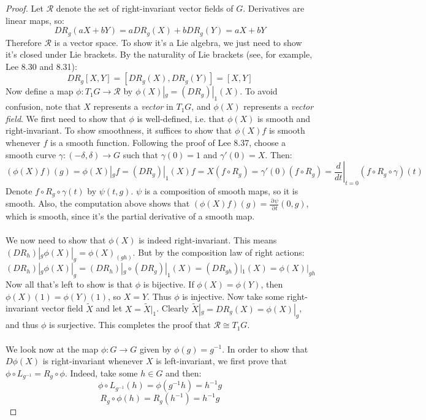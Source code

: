 \documentclass[12 pt]{article}
\DeclareMathOperator {\p} {\partial}
\begin{document}
\begin{proof}
Let $\mathcal{R}$ denote the set of right-invariant vector fields of $G$. Derivatives are linear maps, so: 
\[  DR_g (aX + bY) = a DR_g(X) + b DR_g(Y) = aX + bY \]
Therefore $\mathcal{R}$ is a vector space. To show it's a Lie algebra, we just need to show it's closed under Lie brackets. By the naturality of Lie brackets (see, for example, Lee 8.30 and 8.31):
\[    DR_g [X,Y] = [DR_g (X) , DR_g (Y)] = [X,Y]   \]
Now define a map $\phi : T_1G \to \mathcal{R}$ by $\phi(X)|_{g} = (DR_g)|_{1} (X)$. To avoid confusion, note that $X$ represents a \emph{vector} in $T_1G$, and $\phi(X)$ represents a \emph{vector field}. We first need to show that $\phi$ is well-defined, i.e. that $\phi(X)$ is smooth and right-invariant. To show smoothness, it suffices to show that $\phi(X) f$ is smooth whenever $f$ is a smooth function. Following the proof of Lee 8.37, choose a smooth curve $\gamma: (- \delta, \delta) \to G$ such that $\gamma(0) = 1$ and $\gamma'(0) = X$. Then:
\[      ( \phi(X) f) (g) = \phi(X)|_g f = (DR_g)|_1 (X) f = X(f\circ R_g) = \gamma'(0) (f\circ R_g) = \left.\frac{d}{dt}\right|_{t=0} (f\circ R_g \circ \gamma)(t)     \]
Denote $f\circ R_g \circ \gamma(t)$ by $\psi(t, g)$. $\psi$ is a composition of smooth maps, so it is smooth. Also, the computation above shows that $(\phi(X) f) (g) = \frac{\p \psi}{ \p t }(0,g)$, which is smooth, since it's the partial derivative of a smooth map.
\\
\\
We now need to show that $\phi(X)$ is indeed right-invariant. This means $(DR_h)|_g \phi(X)|_g = \phi(X)_(gh)$. But by the composition law of right actions:
\[           (DR_h)|_g \phi(X)|_g =    (DR_h)|_g\circ (DR_g)|_1 (X)  = (DR_{gh})|_1 (X) = \phi(X)|_{gh}   \]
Now all that's left to show is that $\phi$ is bijective. If $\phi(X) = \phi(Y)$, then $\phi(X) (1) = \phi(Y) (1)$, so $X = Y$. Thus $\phi$ is injective. Now take some right-invariant vector field $\tilde X$ and let $X = \tilde X|_1$. Clearly $\tilde X|_g = DR_{g} (X) = \phi(X)|_g$, and thus $\phi$ is surjective. This completes the proof that $\mathcal{R} \cong T_1 G$.
\\
\\
We look now at the map $\phi:G\to G$ given by $\phi(g) = g^{-1}$. In order to show that $D\phi(X)$ is right-invariant whenever $X$ is left-invariant, we first prove that $\phi\circ L_{g^{-1}} = R_{g} \circ \phi$. Indeed, take some $h\in G$ and then:
\[      \phi\circ L_{g^{-1}} (h) = \phi(g^{-1}h) = h^{-1}g    \]
\[       R_{g} \circ \phi (h) = R_g (h^{-1}) = h^{-1}g   \]

\end{proof}
\end{document}

